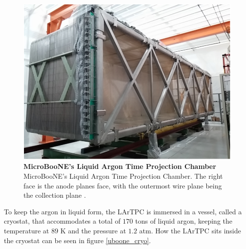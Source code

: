 \begin{figure}[h!]
	\begin{center}
		\includegraphics[scale=0.6]{Figures/uboone_LArTPC.png}
		\caption[MicroBooNE's Liquid Argon Time Projection Chamber]{{\textbf{MicroBooNE's Liquid Argon Time Projection Chamber}} \\MicroBooNE's Liquid Argon Time Projection Chamber. The right face is the anode planes face, with the outermost wire plane being the collection plane \cite{microboone_design}.}
		\label{uboone_lartpc}	
	\end{center}
\end{figure}

To keep the argon in liquid form, the LArTPC is immersed in a vessel, called a cryostat, that accommodates a total of $170$ tons of liquid argon, keeping the temperature at $89$ K and the pressure at $1.2$ atm. How the LArTPC sits inside the cryostat can be seen in figure \ref{uboone_cryo}.

